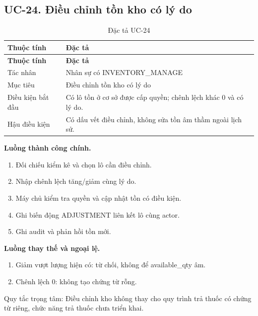 \clearpage

\subsection{UC-24.\allowbreak{} Điều chỉnh tồn kho có lý do}
\label{uc:24}

{\small\setlength{\tabcolsep}{3pt}\renewcommand{\arraystretch}{1.12}
\begin{longtable}{@{}L{\textwidth-1.32pt\relax} L{\textwidth-4.68pt\relax}@{}}
\caption{Đặc tả UC-24}\\
\toprule
\textbf{Thuộc tính} & \textbf{Đặc tả}\\\midrule
\endfirsthead
\toprule
\textbf{Thuộc tính} & \textbf{Đặc tả}\\\midrule
\endhead
\bottomrule\endlastfoot
Tác nhân & Nhân sự có INVENTORY\_\allowbreak{}MANAGE\\[3pt]
Mục tiêu & Điều chỉnh tồn kho có lý do\\[3pt]
Điều kiện bắt đầu & Có lô tồn ở cơ sở được cấp quyền; chênh lệch khác 0 và có lý do.\allowbreak{}\\[3pt]
Hậu điều kiện & Có dấu vết điều chỉnh, không sửa tồn âm thầm ngoài lịch sử.\allowbreak{}\\[3pt]
\end{longtable}}
\noindent\textbf{Luồng thành công chính.}
\begin{enumerate}
\item Đối chiếu kiểm kê và chọn lô cần điều chỉnh.\allowbreak{}
\item Nhập chênh lệch tăng/\allowbreak{}giảm cùng lý do.\allowbreak{}
\item Máy chủ kiểm tra quyền và cập nhật tồn có điều kiện.\allowbreak{}
\item Ghi biến động ADJUSTMENT liên kết lô cùng actor.\allowbreak{}
\item Ghi audit và phản hồi tồn mới.\allowbreak{}
\end{enumerate}
\noindent\textbf{Luồng thay thế và ngoại lệ.}
\begin{enumerate}
\item Giảm vượt lượng hiện có:\allowbreak{} từ chối, không để available\_\allowbreak{}qty âm.\allowbreak{}
\item Chênh lệch 0:\allowbreak{} không tạo chứng từ rỗng.\allowbreak{}
\end{enumerate}
Quy tắc trọng tâm:\allowbreak{} Điều chỉnh kho không thay cho quy trình trả thuốc có chứng từ riêng, chức năng trả thuốc chưa triển khai.\allowbreak{}

